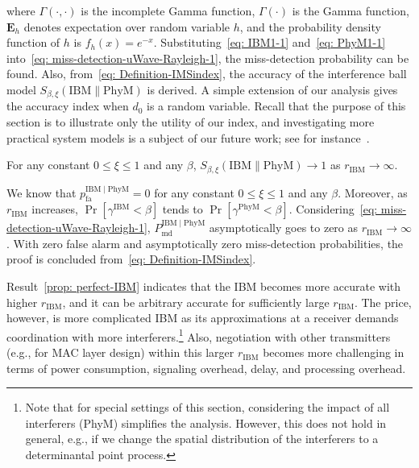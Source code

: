 \documentclass[12pt, draftclsnofoot, onecolumn]{IEEEtran}
\begin{document}
where $\Gamma\left(\cdot, \cdot \right)$ is the incomplete Gamma function, $\Gamma\left(\cdot \right)$ is the Gamma function, $\mathbf{E}_{h}$ denotes expectation over random variable $h$, and the probability density function of $h$ is $f_h(x) = e^{-x}$. Substituting~\eqref{eq: IBM1-1} and~\eqref{eq: PhyM1-1} into~\eqref{eq: miss-detection-uWave-Rayleigh-1}, the miss-detection probability can be found. Also, from~\eqref{eq: Definition-IMSindex}, the accuracy of the interference ball model $S_{\beta,\xi}\left(\mathrm{IBM}\|\mathrm{PhyM} \right)$ is derived. A simple extension of our analysis gives the accuracy index when $d_0$ is a random variable. Recall that the purpose of this section is to illustrate only the utility of our index, and investigating more practical system models is a subject of our future work; see for instance~\cite{jiang2016simplified}.

\begin{result}\label{prop: perfect-IBM}
For any constant $0 \leq \xi \leq 1$ and any $\beta$, \newline $S_{\beta,\xi}\left(\mathrm{IBM}\|\mathrm{PhyM} \right) \to 1$ as $r_{\mathrm{IBM}} \to \infty$.
\end{result}

\begin{IEEEproof}
We know that $p_{\mathrm{fa}}^{{\mathrm{IBM}} \mid {\mathrm{PhyM}}} = 0$ for any constant $0 \leq \xi \leq 1$ and any $\beta$. Moreover, as $r_{\mathrm{IBM}}$ increases, $\Pr \left[\gamma^{\mathrm{IBM}} < \beta \right]$ tends to $\Pr \left[\gamma^{\mathrm{PhyM}} < \beta \right]$. Considering~\eqref{eq: miss-detection-uWave-Rayleigh-1}, $P_{\mathrm{md}}^{{\mathrm{IBM}} \mid {\mathrm{PhyM}}}$ asymptotically goes to zero as $r_{\mathrm{IBM}} \to \infty$. With zero false alarm and asymptotically zero miss-detection probabilities, the proof is concluded from~\eqref{eq: Definition-IMSindex}.
\end{IEEEproof}

Result~\ref{prop: perfect-IBM} indicates that the IBM becomes more accurate with higher $r_{\mathrm{IBM}}$, and it can be arbitrary accurate for sufficiently large $r_{\mathrm{IBM}}$. The price, however, is more complicated IBM as its approximations at a receiver demands coordination with more interferers.\footnote{Note that for special settings of this section, considering the impact of all interferers (PhyM) simplifies the analysis. However, this does not hold in general, e.g., if we change the spatial distribution of the interferers to a determinantal point process.} Also, negotiation with other transmitters (e.g., for MAC layer design) within this larger $r_{\mathrm{IBM}}$ becomes more challenging in terms of power consumption, signaling overhead, delay, and processing overhead.
\end{document}
